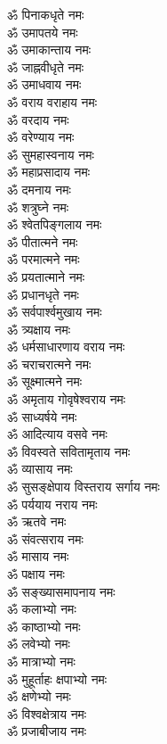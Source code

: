 \begin{multicols}{2}
\begin{flushleft}
ॐ पिनाकधृते नमः\\
ॐ उमापतये नमः\\
ॐ उमाकान्ताय नमः\\
ॐ जाह्नवीधृते नमः\\
ॐ उमाधवाय नमः\hfill{}\\
ॐ वराय वराहाय नमः\\
ॐ वरदाय नमः\\
ॐ वरेण्याय नमः\\
ॐ सुमहास्वनाय नमः\\
ॐ महाप्रसादाय नमः\\
ॐ दमनाय नमः\\
ॐ शत्रुघ्ने नमः\\
ॐ श्वेतपिङ्गलाय नमः\\
ॐ पीतात्मने नमः\\
ॐ परमात्मने नमः\hfill{}\\
ॐ प्रयतात्माने नमः\\
ॐ प्रधानधृते नमः\\
ॐ सर्वपार्श्वमुखाय नमः\\
ॐ त्र्यक्षाय नमः\\
ॐ धर्मसाधारणाय वराय नमः\\
ॐ चराचरात्मने नमः\\
ॐ सूक्ष्मात्मने नमः\\
ॐ अमृताय गोवृषेश्वराय नमः\\
ॐ साध्यर्षये नमः\\
ॐ आदित्याय वसवे नमः\hfill{}\\
ॐ विवस्वते सवितामृताय नमः\\
ॐ व्यासाय नमः\\
ॐ सुसङ्क्षेपाय विस्तराय सर्गाय नमः\\
ॐ पर्ययाय नराय  नमः\\
ॐ ऋतवे नमः\\
ॐ संवत्सराय नमः\\
ॐ मासाय नमः\\
ॐ पक्षाय नमः\\
ॐ सङ्ख्यासमापनाय नमः\\
ॐ कलाभ्यो नमः\hfill{}\\
ॐ काष्ठाभ्यो नमः\\
ॐ लवेभ्यो नमः\\
ॐ मात्राभ्यो नमः\\
ॐ मुहूर्ताहः क्षपाभ्यो नमः\\
ॐ क्षणेभ्यो नमः\\
ॐ विश्वक्षेत्राय नमः\\
ॐ प्रजाबीजाय नमः\\

\end{flushleft}
\end{multicols}
